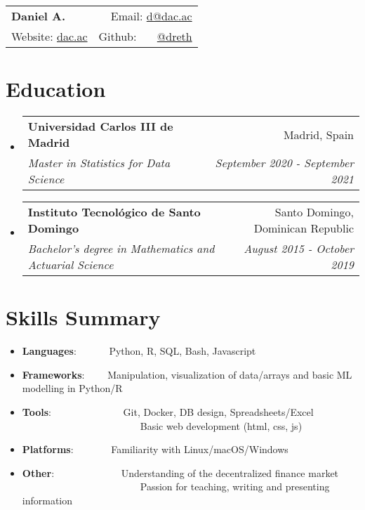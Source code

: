 \documentclass[a4paper,20pt]{article}
\makeatletter
\newcommand{\resumeItem}[2]{
  \item\small{
    \textbf{#1}{: #2 \vspace{-2pt}}
  }
}
\newcommand{\resumeSubheading}[4]{
  \vspace{-1pt}\item
    \begin{tabular*}{0.97\textwidth}{l@{\extracolsep{\fill}}r}
      \textbf{#1} & #2 \\
      \textit{#3} & \textit{#4} \\
    \end{tabular*}\vspace{-5pt}
}
\newcommand{\resumeSubItem}[2]{\resumeItem{#1}{#2}\vspace{-3pt}}
\newcommand{\resumeSubHeadingListStart}{\begin{itemize}[leftmargin=*]}
\newcommand{\resumeSubHeadingListEnd}{\end{itemize}}
\makeatother
\begin{document}
\begin{tabular*}{\textwidth}{l@{\extracolsep{\fill}}r}
  \textbf{{\LARGE Daniel A.}} & Email: {\color{blue}\href{mailto:}{d@dac.ac}}\\
  Website: {\color{blue}\href{https://dac.ac}{dac.ac}} & Github: ~~~{\color{blue}\href{https://github.com/dreth}{@dreth}}
\end{tabular*}




            
\vspace{-4pt}
\section{Education}
\resumeSubHeadingListStart
        
  \resumeSubheading
    {Universidad Carlos III de Madrid}{Madrid, Spain}
    {Master in Statistics for Data Science}{September 2020 - September 2021}
\vspace{-2pt}
  \resumeSubheading
    {Instituto Tecnológico de Santo Domingo}{Santo Domingo, Dominican Republic}
    {Bachelor's degree in Mathematics and Actuarial Science}{August 2015 - October 2019}
\resumeSubHeadingListEnd


            
\vspace{-7pt}
\section{Skills Summary}
  \resumeSubHeadingListStart
            
        
\vspace{-2pt}
\resumeSubItem{Languages}{~~~~~~Python, R, SQL, Bash, Javascript}
\vspace{-2pt}
\resumeSubItem{Frameworks}{~~~~Manipulation, visualization of data/arrays and basic ML modelling in Python/R}
\vspace{-2pt}
\resumeSubItem{Tools}{~~~~~~~~~~~~~~Git, Docker, DB design, Spreadsheets/Excel\\~~~~~~~~~~~~~~~~~~~~~~~~Basic web development (html, css, js)}
\vspace{-2pt}
\resumeSubItem{Platforms}{~~~~~~~Familiarity with Linux/macOS/Windows}
\vspace{-2pt}
\resumeSubItem{Other}{~~~~~~~~~~~~~Understanding of the decentralized finance market\\~~~~~~~~~~~~~~~~~~~~~~~~Passion for teaching, writing and presenting information}
\resumeSubHeadingListEnd
\end{document}
